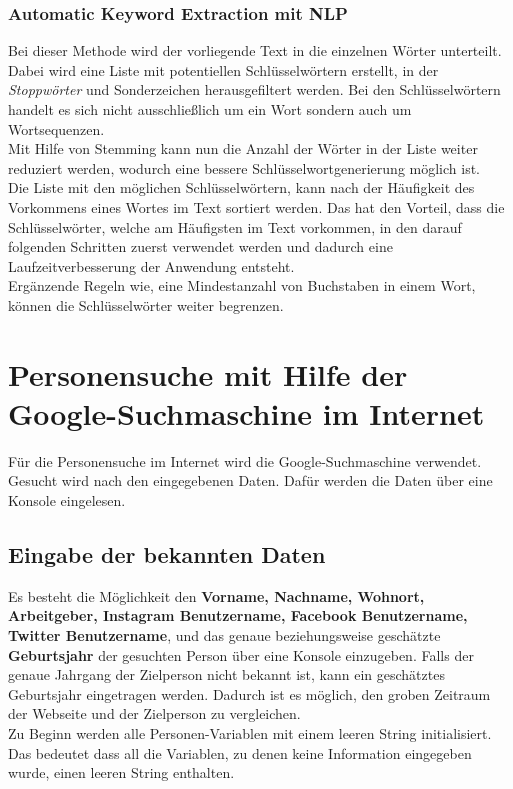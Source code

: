 \subsubsection{Automatic Keyword Extraction mit NLP}
\label{sec:Automatic Keyword Extraction}
Bei dieser Methode wird der vorliegende Text in die einzelnen Wörter unterteilt. Dabei wird eine Liste mit potentiellen Schlüsselwörtern erstellt, in der \textit{Stoppwörter} und Sonderzeichen herausgefiltert werden. Bei den Schlüsselwörtern handelt es sich nicht ausschließlich um ein Wort sondern auch um Wortsequenzen.\\
Mit Hilfe von Stemming kann nun die Anzahl der Wörter in der Liste weiter reduziert werden, wodurch eine bessere Schlüsselwortgenerierung möglich ist. \\
Die Liste mit den möglichen Schlüsselwörtern, kann nach der Häufigkeit des Vorkommens eines Wortes im Text sortiert werden. Das hat den Vorteil, dass die Schlüsselwörter, welche am Häufigsten im Text vorkommen, in den darauf folgenden Schritten zuerst verwendet werden und dadurch eine Laufzeitverbesserung der Anwendung entsteht.\\
Ergänzende Regeln wie, eine Mindestanzahl von Buchstaben in einem Wort, können die Schlüsselwörter weiter begrenzen. 

\section{Personensuche mit Hilfe der Google-Suchmaschine im Internet}
Für die Personensuche im Internet wird die Google-Suchmaschine verwendet. Gesucht wird nach den eingegebenen Daten. Dafür werden die Daten über eine Konsole eingelesen.
	\subsection{Eingabe der bekannten Daten}
	Es besteht die Möglichkeit den \textbf{Vorname, Nachname, Wohnort, Arbeitgeber, Instagram Benutzername, Facebook Benutzername, Twitter Benutzername}, und das genaue beziehungsweise geschätzte \textbf{Geburtsjahr} der gesuchten Person über eine Konsole einzugeben. Falls der genaue Jahrgang der Zielperson nicht bekannt ist, kann ein geschätztes Geburtsjahr eingetragen werden. Dadurch ist es möglich, den groben Zeitraum der Webseite und der Zielperson zu vergleichen.\\
	Zu Beginn werden alle Personen-Variablen mit einem leeren String initialisiert. Das bedeutet dass all die Variablen, zu denen keine Information eingegeben wurde, einen leeren String enthalten.
	
